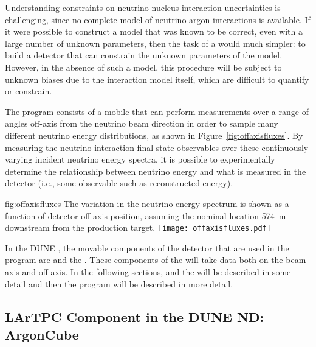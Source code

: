 Understanding   constraints on neutrino-nucleus interaction uncertainties is challenging, since no complete model of neutrino-argon interactions is available. If it were possible to construct a model that was known to be correct, even with a large number of unknown parameters, then the task of a   would much simpler: to build a detector that can constrain the unknown parameters of the model. However, in the absence of such a model, this procedure will be subject to unknown biases due to the interaction model itself, which are difficult to quantify or constrain.

The    program consists of a mobile   
that can perform measurements over a range of angles off-axis from the neutrino beam direction in order to sample many different neutrino energy distributions, as shown in Figure~\ref{fig:offaxisfluxes}. By measuring the neutrino-interaction final state observables over these continuously varying incident neutrino energy spectra, it is possible to experimentally determine the relationship between neutrino energy and what is measured in the detector (i.e., some observable such as reconstructed energy).



\begin{dunefigure}{fig:offaxisfluxes}
{The variation in the neutrino energy spectrum is shown as a function of detector off-axis position, assuming the nominal  location \SI{574}{m} downstream from the production target.}
\texttt{[image: offaxisfluxes.pdf]}
\end{dunefigure}


In the DUNE , the movable components of the detector that are used in the  program are  and the .  These components of the  will take data both on the beam axis and off-axis.  In the following sections,  and the  will be described in some detail and then the  program will be described in more detail.

\subsection{LArTPC Component in the DUNE ND: ArgonCube}
\label{sec:appx-nd:lartpc}


